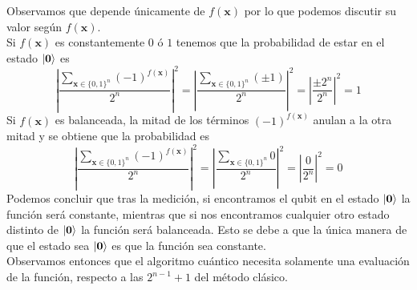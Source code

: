 \documentclass[a4paper]{article}
\numberwithin{equation}{section}
\begin{document}
Observamos que depende únicamente de $f(\mathbf{x})$ por lo que podemos discutir su valor según $f(\mathbf{x})$.\\
Si $f(\mathbf{x})$ es constantemente $0$ ó $1$ tenemos que la probabilidad de estar en el estado $\ket{\mathbf{0}}$ es
\begin{equation}
\left\vert \frac{\sum_{\mathbf{x}\in\{ 0, 1\}^n} (-1)^{f(\mathbf{x})}}{2^n} \right\vert^2  =
\left\vert \frac{\sum_{\mathbf{x}\in\{ 0, 1\}^n} (\pm 1)}{2^n} \right\vert^2 =
\left\vert \frac{\pm 2^n}{2^n} \right\vert^2 = 1
\end{equation}
Si $f(\mathbf{x})$ es balanceada, la mitad de los términos $(-1)^{f(\mathbf{x})}$ anulan a la otra mitad y se obtiene que la probabilidad es
\begin{equation}
\left\vert \frac{\sum_{\mathbf{x}\in\{ 0, 1\}^n} (-1)^{f(\mathbf{x})}}{2^n} \right\vert^2  =
\left\vert \frac{\sum_{\mathbf{x}\in\{ 0, 1\}^n} 0}{2^n} \right\vert^2 =
\left\vert \frac{0}{2^n} \right\vert^2 = 0
\end{equation}
Podemos concluir que tras la medición, si encontramos el qubit en el estado $\ket{\mathbf{0}}$ la función será constante, mientras que si nos encontramos cualquier otro estado distinto de $\ket{\mathbf{0}}$ la función será balanceada. Esto se debe a que la única manera de que el estado sea $\ket{\mathbf{0}}$ es que la función sea constante.\\
\linebreak
Observamos entonces que el algoritmo cuántico necesita solamente una evaluación de la función, respecto a las $2^{n-1}+1$ del método clásico.

\newpage
\end{document}
